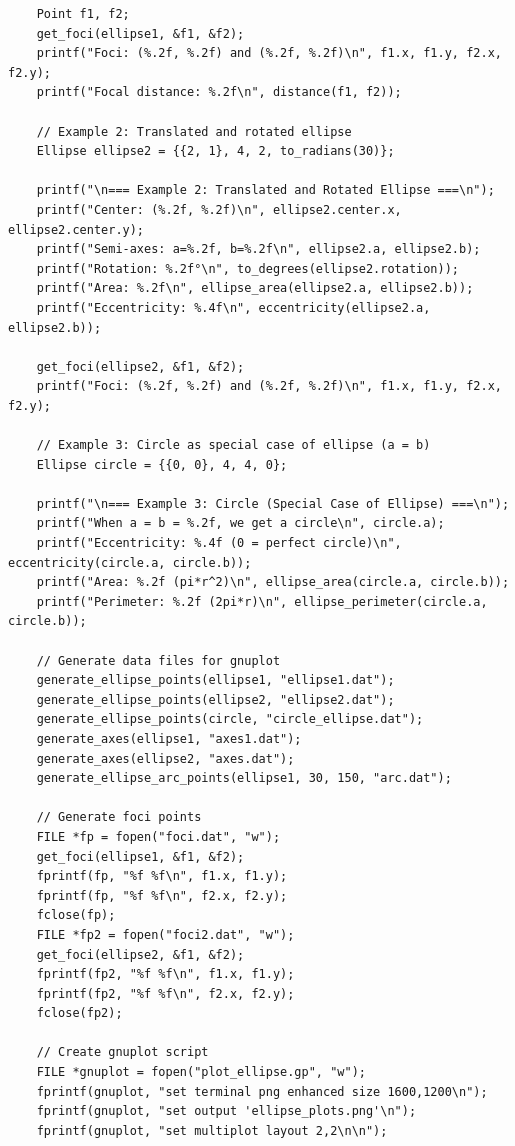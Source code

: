 \documentclass[a4paper,14pt]{article}
\begin{document}
{\begin{verbatim}
    Point f1, f2;
    get_foci(ellipse1, &f1, &f2);
    printf("Foci: (%.2f, %.2f) and (%.2f, %.2f)\n", f1.x, f1.y, f2.x, f2.y);
    printf("Focal distance: %.2f\n", distance(f1, f2));

    // Example 2: Translated and rotated ellipse
    Ellipse ellipse2 = {{2, 1}, 4, 2, to_radians(30)};

    printf("\n=== Example 2: Translated and Rotated Ellipse ===\n");
    printf("Center: (%.2f, %.2f)\n", ellipse2.center.x, ellipse2.center.y);
    printf("Semi-axes: a=%.2f, b=%.2f\n", ellipse2.a, ellipse2.b);
    printf("Rotation: %.2f°\n", to_degrees(ellipse2.rotation));
    printf("Area: %.2f\n", ellipse_area(ellipse2.a, ellipse2.b));
    printf("Eccentricity: %.4f\n", eccentricity(ellipse2.a, ellipse2.b));

    get_foci(ellipse2, &f1, &f2);
    printf("Foci: (%.2f, %.2f) and (%.2f, %.2f)\n", f1.x, f1.y, f2.x, f2.y);

    // Example 3: Circle as special case of ellipse (a = b)
    Ellipse circle = {{0, 0}, 4, 4, 0};

    printf("\n=== Example 3: Circle (Special Case of Ellipse) ===\n");
    printf("When a = b = %.2f, we get a circle\n", circle.a);
    printf("Eccentricity: %.4f (0 = perfect circle)\n", eccentricity(circle.a, circle.b));
    printf("Area: %.2f (pi*r^2)\n", ellipse_area(circle.a, circle.b));
    printf("Perimeter: %.2f (2pi*r)\n", ellipse_perimeter(circle.a, circle.b));

    // Generate data files for gnuplot
    generate_ellipse_points(ellipse1, "ellipse1.dat");
    generate_ellipse_points(ellipse2, "ellipse2.dat");
    generate_ellipse_points(circle, "circle_ellipse.dat");
    generate_axes(ellipse1, "axes1.dat");
    generate_axes(ellipse2, "axes.dat");
    generate_ellipse_arc_points(ellipse1, 30, 150, "arc.dat");

    // Generate foci points
    FILE *fp = fopen("foci.dat", "w");
    get_foci(ellipse1, &f1, &f2);
    fprintf(fp, "%f %f\n", f1.x, f1.y);
    fprintf(fp, "%f %f\n", f2.x, f2.y);
    fclose(fp);
    FILE *fp2 = fopen("foci2.dat", "w");
    get_foci(ellipse2, &f1, &f2);
    fprintf(fp2, "%f %f\n", f1.x, f1.y);
    fprintf(fp2, "%f %f\n", f2.x, f2.y);
    fclose(fp2);

    // Create gnuplot script
    FILE *gnuplot = fopen("plot_ellipse.gp", "w");
    fprintf(gnuplot, "set terminal png enhanced size 1600,1200\n");
    fprintf(gnuplot, "set output 'ellipse_plots.png'\n");
    fprintf(gnuplot, "set multiplot layout 2,2\n\n");


\end{verbatim}}
\end{document}
